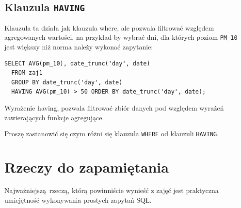 \documentclass[a4paper]{article}
\begin{document}
\subsection{Klauzula \texttt{HAVING}%
  \label{klauzula-having}%
}

Klauzula ta działa jak klauzula where, ale pozwala filtrować
względem agregowanych wartości, na przykład by wybrać dni,
dla których poziom \texttt{PM\_10} jest większy niż norma
należy wykonać zapytanie:

\begin{verbatim}
SELECT AVG(pm_10), date_trunc('day', date)
  FROM zaj1
  GROUP BY date_trunc('day', date)
  HAVING AVG(pm_10) > 50 ORDER BY date_trunc('day', date);
\end{verbatim}


Wyrażenie having, pozwala filtrować zbiór danych pod względem wyrażeń
zawierających funkcje agregujące.

Proszę zastanowić się czym różni się klauzula \texttt{WHERE} od klauzuli \texttt{HAVING}.


\section{Rzeczy do zapamiętania%
  \label{rzeczy-do-zapamietania}%
}

Najważniejszą~rzeczą, którą powinniście wynieść z zajęć jest praktyczna
umiejętność wykonywania prostych zapytań SQL.
\end{document}
